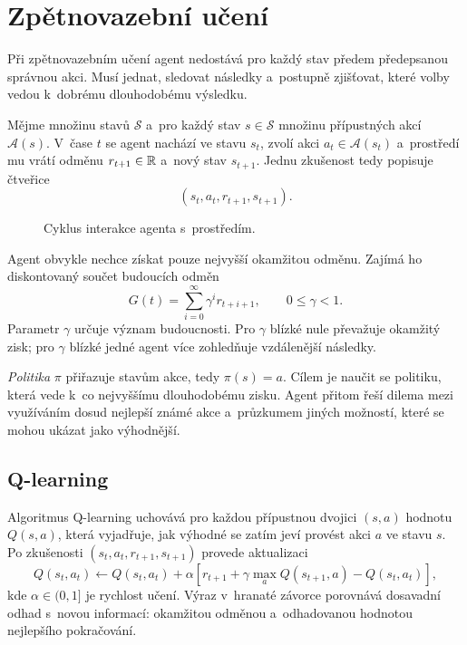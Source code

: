 \section{Zpětnovazební učení}\label{sec:ai-reinforcement}

Při zpětnovazebním učení agent nedostává pro každý stav předem předepsanou správnou akci. Musí jednat, sledovat následky a~postupně zjišťovat, které volby vedou k~dobrému dlouhodobému výsledku.

Mějme množinu stavů \(\mathcal{S}\) a~pro každý stav \(s\in\mathcal{S}\) množinu přípustných akcí \(\mathcal{A}(s)\). V~čase \(t\) se agent nachází ve stavu \(s_t\), zvolí akci \(a_t\in\mathcal{A}(s_t)\) a~prostředí mu vrátí odměnu \(r_{t+1}\in\mathbb{R}\) a~nový stav \(s_{t+1}\). Jednu zkušenost tedy popisuje čtveřice
\[
    (s_t,a_t,r_{t+1},s_{t+1}).
\]

\begin{figure}[ht]
    \centering
    
    \caption{Cyklus interakce agenta s~prostředím.}
    \label{fig:ai-zpetna-vazba}
\end{figure}

Agent obvykle nechce získat pouze nejvyšší okamžitou odměnu. Zajímá ho diskontovaný součet budoucích odměn
\[
    G(t)
    =
    \sum_{i=0}^{\infty}
    \gamma^i r_{t+i+1},
    \qquad
    0\leqslant\gamma<1.
\]
Parametr \(\gamma\) určuje význam budoucnosti. Pro \(\gamma\) blízké nule převažuje okamžitý zisk; pro \(\gamma\) blízké jedné agent více zohledňuje vzdálenější následky.

\emph{Politika} \(\pi\) přiřazuje stavům akce, tedy \(\pi(s)=a\). Cílem je naučit se politiku, která vede k~co nejvyššímu dlouhodobému zisku. Agent přitom řeší dilema mezi využíváním dosud nejlepší známé akce a~průzkumem jiných možností, které se mohou ukázat jako výhodnější.

\subsection{Q-learning}

Algoritmus Q-learning uchovává pro každou přípustnou dvojici \((s,a)\) hodnotu \(Q(s,a)\), která vyjadřuje, jak výhodné se zatím jeví provést akci \(a\) ve stavu \(s\). Po zkušenosti
\((s_t,a_t,r_{t+1},s_{t+1})\) provede aktualizaci
\[
    Q(s_t,a_t)
    \gets
    Q(s_t,a_t)
    +
    \alpha
    \left[
        r_{t+1}
        +
        \gamma\max_a Q(s_{t+1},a)
        -
        Q(s_t,a_t)
    \right],
\]
kde \(\alpha\in(0,1]\) je rychlost učení. Výraz v~hranaté závorce porovnává dosavadní odhad s~novou informací: okamžitou odměnou a~odhadovanou hodnotou nejlepšího pokračování.

